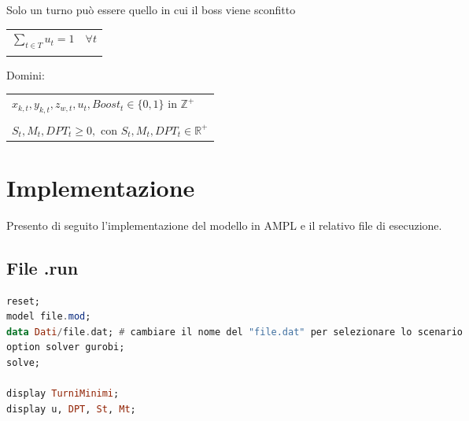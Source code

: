 \documentclass[12pt]{article}
\begin{document}
    Solo un turno può essere quello in cui il boss viene sconfitto \\
    \begin{tabular*}{\textwidth}{@{\extracolsep{\fill}} ll}
        \\
        $\sum_{t \in T} u_t = 1$  & $\forall t$\\
        \\
    \end{tabular*}

    Domini:\\
    \begin{tabular*}{\textwidth}{@{\extracolsep{\fill}} l}\\
        $x_{k,t}, y_{k,t}, z_{w,t}, u_t, Boost_t \in \{0,1\}$ in $\mathbb{Z}^+$\\
         \\
         $S_t, M_t, DPT_t \geq 0, \text{ con  } S_t, M_t, DPT_t \in \mathbb{R}^+$\\
    \end{tabular*}
    
    \section{Implementazione}
    Presento di seguito l'implementazione del modello in AMPL e il relativo file di esecuzione.
    \subsection{File .run}
    \begin{lstlisting}[language=haskell, frame=single, caption={File di esecuzione}, captionpos=b, keywordstyle=\color{purple}]  
reset;
model file.mod;
data Dati/file.dat; # cambiare il nome del "file.dat" per selezionare lo scenario
option solver gurobi;
solve;
        
display TurniMinimi; 
display u, DPT, St, Mt;
    \end{lstlisting}
\newpage
\end{document}
